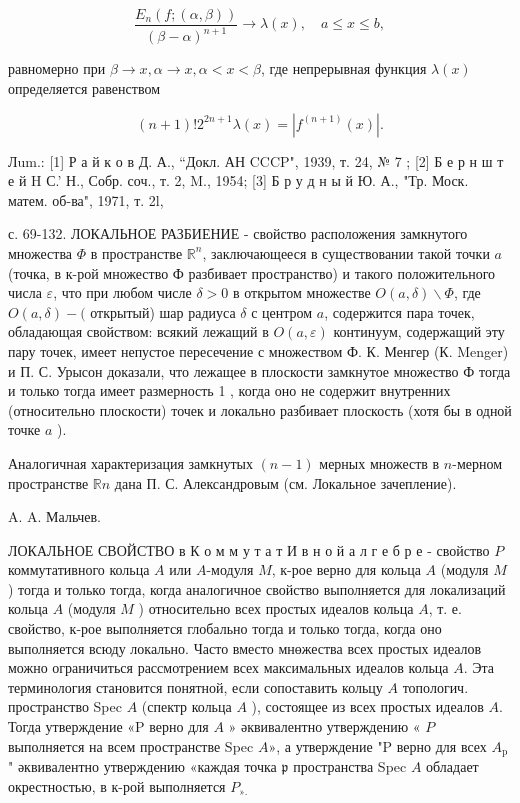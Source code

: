 \documentclass[10pt]{article}
\begin{document}
\[

\frac{E_{n}(f ;(\alpha, \beta))}{(\beta-\alpha)^{n+1}} \rightarrow \lambda(x), \quad a \leqslant x \leqslant b,

\]



равномерно при $\beta \rightarrow x, \alpha \rightarrow x, \alpha<x<\beta$, где непрерывная функция $\lambda(x)$ определяется равенством



\[

(n+1) ! 2^{2 n+1} \lambda(x)=\left|f^{(n+1)}(x)\right| .

\]



Лum.: [1] Р а й к о в Д. А., “Докл. АН CCCP", 1939, т. 24, № 7 ; [2] Б е р н ш т е й $\mathrm{H}$ С.' Н., Собр. соч., т. 2, M., 1954; [3] Б р у д н ы й Ю. А., "Тр. Моск. матем. об-ва", 1971, т. 2l,

с. 69-132. ЛОКАЛЬНОЕ РАЗБИЕНИЕ - свойство расположения замкнутого множества $\Phi$ в пространстве $\mathbb{R}^{n}$, заключающееся в существовании такой точки $a$ (точка, в к-рой множество Ф разбивает пространство) и такого положительного числа $\varepsilon$, что при любом числе $\delta>0$ в открытом множестве $O(a, \delta) \backslash \Phi$, где $O(a, \delta)-($ открытый) шар радиуса $\delta$ с центром $a$, содержится пара точек, обладающая свойством: всякий лежащий в $O(a, \varepsilon)$ континуум, содержащий эту пару точек, имеет непустое пересечение с множеством Ф. К. Менгер (К. Menger) и П. С. Урысон доказали, что лежащее в плоскости замкнутое множество Ф тогда и только тогда имеет размерность 1 , когда оно не содержит внутренних (относительно плоскости) точек и локально разбивает плоскость (хотя бы в одной точке $a$ ).



Аналогичная характеризация замкнутых $(n-1)$ мерных множеств в $n$-мерном пространстве $\mathbb{R} n$ дана П. С. Александровым (см. Локальное зачепление).



A. A. Мальчев.



ЛОКАЛЬНОЕ СВОЙСТВО в К о м м у т а т И в н о й а л г е б р е - свойство $P$ коммутативного кольца $A$ или $A$-модуля $M$, к-рое верно для кольца $A$ (модуля $M$ ) тогда и только тогда, когда аналогичное свойство выполняется для локализаций кольца $A$ (модуля $M$ ) относительно всех простых идеалов кольца $A$, т. е. свойство, к-рое выполняется глобально тогда и только тогда, когда оно выполняется всюду локально. Часто вместо мнөжества всех простых идеалов можно ограничиться рассмотрением всех максимальных идеалов кольца $A$. Эта терминология становится понятной, если сопоставить кольцу $A$ топологич. пространство Spec $A$ (спектр кольца $A$ ), состоящее из всех простых идеалов $A$. Тогда утверждение «P верно для $A$ » әквивалентно утверждению « $P$ выполняется на всем пространстве Spec $A »$, а утверждение "P верно для всех $A_{\text {p }}$ " әквивалентно утверждению «каждая точка $\mathfrak{p}$ пространства Spec $A$ обладает окрестностью, в к-рой выполняется $P_{\text {». }}$
\end{document}
